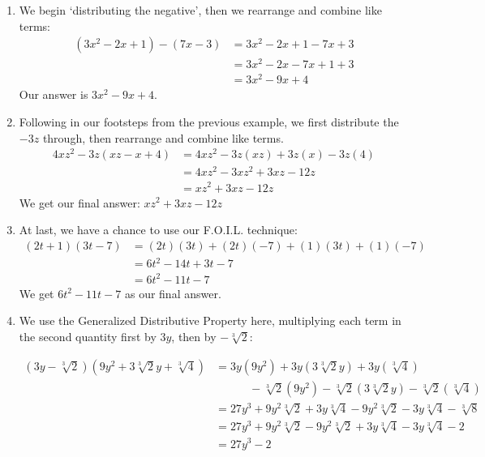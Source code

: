 {
\begin{enumerate}

\item  We begin `distributing the negative', then we rearrange and combine like terms:
\begin{align*}
\left(3x^2 - 2x + 1\right) - (7x-3) &  =  3x^2-2x+1 - 7x + 3  \tag*{Distribute} \\
                       & =  3x^2  -2x - 7x + 1 + 3  \tag*{Rearrange terms} \\							   & =  3x^2 - 9x + 4  \tag*{Combine like terms}
\end{align*}
Our answer is $3x^2 - 9x + 4$.

\item  Following in our footsteps from the previous example, we first distribute the $-3z$ through, then rearrange and combine like terms.
\begin{align*}
4xz^2 - 3z(xz - x + 4) & =  4xz^2 - 3z(xz) + 3z (x) - 3z(4)  \tag*{Distribute} \\
                       & =  4xz^2 - 3xz^2 + 3xz - 12 z  \tag*{Multiply} \\
					   & =  xz^2+ 3xz - 12 z  \tag*{Combine like terms}
\end{align*}
We get our final answer: $xz^2+ 3xz - 12z$


\item  At last, we have a chance to use our F.O.I.L. technique:
\begin{align*}
(2t+1)(3t - 7) & =  (2t)(3t) + (2t)(-7) + (1)(3t) + (1)(-7)  \tag*{F.O.I.L.} \\
               & =  6t^2 - 14t + 3t - 7  \tag*{Multiply} \\
			   & =  6t^2 - 11t - 7  \tag*{Combine like terms}
\end{align*} 
We get $6t^2 - 11t - 7$ as our final answer.

\item  We use the Generalized Distributive Property here, multiplying each term in the second quantity first by $3y$, then by $-\sqrt[3]{2}$:

\noindent\hskip-50pt
\begin{minipage}{1.1\textwidth}
\begin{align*}
\left(3y - \sqrt[3]{2}\right)\left(9y^2 + 3\sqrt[3]{2} y + \sqrt[3]{4}\right)  &=3y\left(9y^2\right) +3y\left(3\sqrt[3]{2} y\right) + 3y\left(\sqrt[3]{4}\right) \\
       &\quad \quad \quad -\sqrt[3]{2} \left(9y^2\right) - \sqrt[3]{2} \left(3\sqrt[3]{2} y\right) -\sqrt[3]{2} \left(\sqrt[3]{4}\right)  \\
			  & =  27y^3 + 9y^2 \sqrt[3]{2} + 3y \sqrt[3]{4} - 9y^2\sqrt[3]{2} - 3y \sqrt[3]{4} - \sqrt[3]{8}  \\
				& =  27y^3 + 9y^2 \sqrt[3]{2} - 9y^2 \sqrt[3]{2} + 3y \sqrt[3]{4} - 3y \sqrt[3]{4} - 2  \\
				& =  27y^3 - 2 \\ 
\end{align*}
\end{minipage}


\end{enumerate}}
